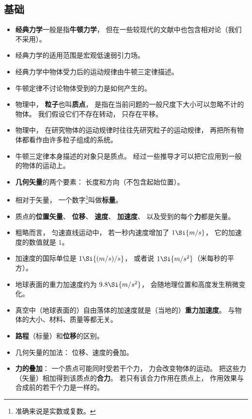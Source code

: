 
\begin{issues}
\issueDraft
\end{issues}

\subsection{基础}
\begin{itemize}
\item \textbf{经典力学}一般是指\textbf{牛顿力学}， 但在一些较现代的文献中也包含相对论（我们不采用）。
\item 经典力学的适用范围是宏观低速弱引力场。
\item 经典力学中物体受力后的运动规律由牛顿三定律描述。
\item 牛顿定律不讨论物体受到的力是如何产生的。
\item 物理中， \textbf{粒子}也叫\textbf{质点}， 是指在当前问题的一般尺度下大小可以忽略不计的物体。 我们假设它们不存在转动， 只存在平移。
\item 物理中， 在研究物体的运动规律时往往先研究粒子的运动规律， 再把所有物体都看作由许多粒子组成的系统。
\item 牛顿三定律本身描述的对象只是质点。 经过一些推导才可以把它应用到一般的物体的运动上。
\item \textbf{几何矢量}的两个要素： 长度和方向（不包含起始位置）。
\item 相对于矢量， 一个数字\footnote{准确来说是实数或复数。}叫做\textbf{标量}。
\item 质点的\textbf{位置矢量}、 \textbf{位移}、 \textbf{速度}、 \textbf{加速度}、 以及受到的每个\textbf{力}都是矢量。
\item 粗略而言， 匀速直线运动中， 若一秒内速度增加了 $1\Si{m/s}$， 它的加速度的数值就是 $1$。
\item 加速度的国际单位是 $1\Si{(m/s)/s}$， 或者说 $1\Si{m/s^2}$（米每秒的平方）。
\item 地球表面的重力加速度约为 $9.8\Si{m/s^2}$， 会随地理位置和高度发生稍微变化。
\item 真空中（地球表面的）自由落体的加速度就是（当地的）\textbf{重力加速度}。 与物体的大小、材料、质量等都无关。
\item \textbf{路程}（标量）和\textbf{位移}的区别。
\item 几何矢量的加法： 位移、速度的叠加。
\item \textbf{力的叠加}： 一个质点可能同时受若干个力， 力会改变物体的运动。 把这些力（矢量）相加得到该质点的\textbf{合力}。 若只有该合力作用在质点上， 作用效果与合成前的若干个力是一样的。

\end{itemize}
